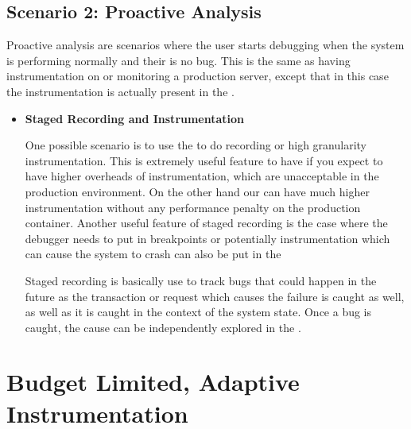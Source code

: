 \subsection{Scenario 2: Proactive Analysis}

Proactive analysis are scenarios where the user starts debugging when the system is performing normally and their is no bug. This is the same as having instrumentation on or monitoring a production server, except that in this case the instrumentation is actually present in the \debugcontainer.

\begin{itemize}
	
	\item \textbf{Staged Recording and Instrumentation}
	
	One possible scenario is to use the \debugcontainer to do recording or high granularity instrumentation. This is extremely useful feature to have if you expect to have higher overheads of instrumentation, which are unacceptable in the production environment. 
	On the other hand our \debugcontainer can have much higher instrumentation without any performance penalty on the production container.
	Another useful feature of staged recording is the case where the debugger needs to put in breakpoints or potentially instrumentation which can cause the system to crash can also be put in the \debugcontainer
	
	Staged recording is basically use to track bugs that could happen in the future as the transaction or request which causes the failure is caught as well, as well as it is caught in the context of the system state. 
	Once a bug is caught, the cause can be independently explored in the \debugcontainer.
	
\end{itemize}

\section{Budget Limited, Adaptive Instrumentation}
\label{sec:budget-limited}

